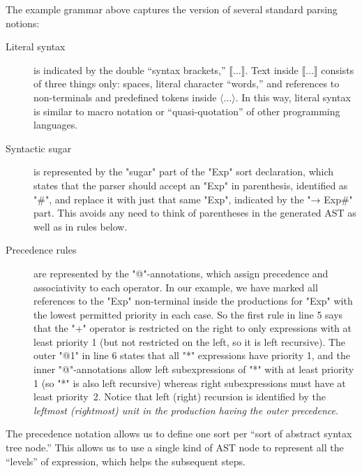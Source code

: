 \documentclass[11pt]{article} %
\begin{document}
The example grammar above captures the \HAX version of several standard parsing notions:
\begin{description}

\item[Literal syntax] is indicated by the double ``syntax brackets,'' $⟦…⟧$.  Text inside $⟦…⟧$
  consists of three things only: spaces, literal character ``words,'' and references to
  non-terminals and predefined tokens inside $⟨…⟩$.  In this way, literal syntax is similar to macro
  notation or ``quasi-quotation'' of other programming languages.

\item[Syntactic sugar] is represented by the "sugar" part of the "Exp" sort declaration, which
  states that the parser should accept an "Exp" in parenthesis, identified as "#", and replace it
  with just that same "Exp", indicated by the "→ Exp#" part.  This avoids any need to think of
  parentheses in the generated AST as well as in rules below.

\item[Precedence rules] are represented by the "@"-annotations, which assign precedence and
  associativity to each operator. In our example, we have marked all references to the "Exp"
  non-terminal inside the productions for "Exp" with the lowest permitted priority in each case. So
  the first rule in line 5 says that the "+" operator is restricted on the right to only expressions
  with at least priority 1 (but not restricted on the left, so it is left recursive). The outer "@1"
  in line 6 states that all "*" expressions have priority 1, and the inner "@"-annotations allow
  left subexpressions of "*" with at least priority 1 (so "*" is also left recursive) whereas right
  subexpressions must have at least priority~2. Notice that left (right) recursion is identified by
  the \emph{leftmost (rightmost) unit in the production having the outer precedence}.

\end{description}
The precedence notation allows us to define one sort per ``sort of abstract syntax tree node.''
This allows us to use a single kind of AST node to represent all the ``levels'' of expression, which
helps the subsequent steps.
\end{document}
